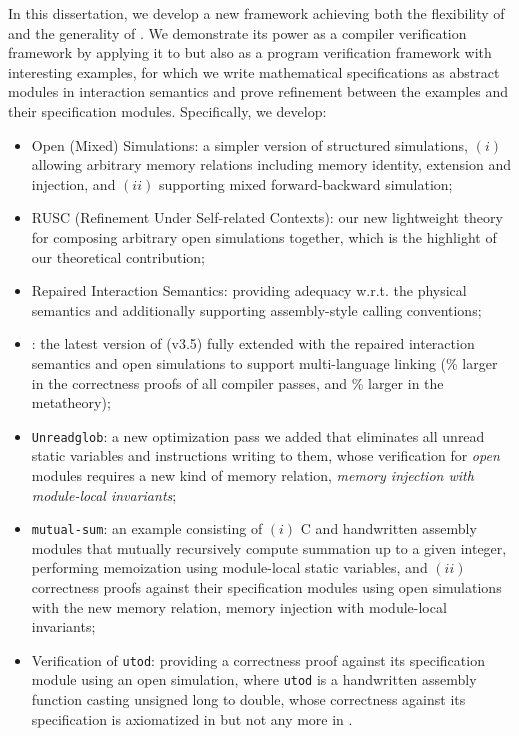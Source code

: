 %
In this dissertation, we develop a new framework achieving both the
flexibility of \ccx{} and the generality of \ccc{}.  We demonstrate
its power as a compiler verification framework by applying it to \cc{}
but also as a program verification framework with interesting
examples, for which we write mathematical specifications as abstract
modules in interaction semantics and prove refinement between the
examples and their specification modules.  Specifically, we develop:
\begin{itemize}
\item Open (Mixed) Simulations: a simpler version of structured simulations,
  $(i)$ allowing arbitrary memory relations including memory identity, extension and injection,
  and $(ii)$ supporting mixed forward-backward simulation;
\item RUSC (Refinement Under Self-related Contexts): our new
  lightweight theory for composing arbitrary open simulations
  together, which is the highlight of our theoretical contribution;
\item Repaired Interaction Semantics: providing adequacy w.r.t. the
  physical semantics and additionally supporting assembly-style
  calling conventions;
\item \ccm{}: the latest version of \cc{} (v3.5) fully extended with
  the repaired interaction semantics and open simulations to support
  multi-language linking (\% larger in the correctness
  proofs of all compiler passes, and \% larger in the metatheory);
\item \texttt{Unreadglob}:
  a new optimization pass we added that eliminates all unread static
  variables and instructions writing to them,
  whose verification for \emph{open} modules requires
  a new kind of memory relation, \emph{memory injection with module-local
  invariants};
\item \texttt{mutual-sum}: an example consisting of $(i)$ C and
  handwritten assembly modules that mutually recursively compute
  summation up to a given integer, performing memoization using
  module-local static variables, and $(ii)$ correctness proofs
  against their specification modules using open simulations with the
  new memory relation, memory injection with module-local invariants;
\item Verification of \texttt{utod}: providing a correctness proof
  against its specification module using an open simulation,
  where \texttt{utod} is a handwritten
  assembly function casting unsigned long to double, whose correctness
  against its specification is axiomatized in \cc{} but not any more
  in \ccm{}.
\end{itemize}
\medskip

